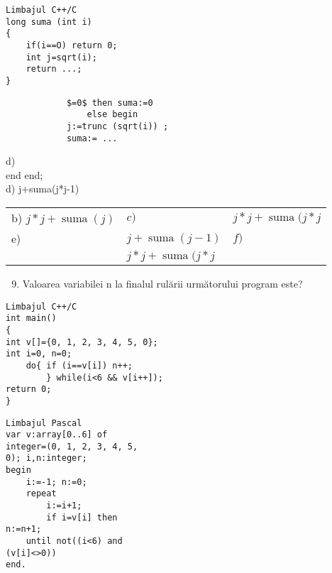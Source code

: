 \begin{verbatim}
Limbajul C++/C
long suma (int i)
{
    if(i==O) return 0;
    int j=sqrt(i);
    return ...;
}
\end{verbatim}

\begin{verbatim}
            $=0$ then suma:=0
                else begin
            j:=trunc (sqrt(i)) ;
            suma:= ...
\end{verbatim}

d)\\
end end;\\
d) j+suma(j*j-1)

\begin{center}
\begin{tabular}{lll}
b) $j * j+\operatorname{suma}(j)$ & $c)$ & $j * j+\operatorname{suma}(j * j$ \\
e) & $j+\operatorname{suma}(j-1)$ & $f)$ \\
 & $j * j+\operatorname{suma}(j * j$ &  \\
\end{tabular}
\end{center}

\begin{enumerate}
  \setcounter{enumi}{8}
  \item Valoarea variabilei n la finalul rulării următorului program este?
\end{enumerate}

\begin{verbatim}
Limbajul C++/C
int main()
{
int v[]={0, 1, 2, 3, 4, 5, 0};
int i=0, n=0;
    do{ if (i==v[i]) n++;
        } while(i<6 && v[i++]);
return 0;
}
\end{verbatim}

\begin{verbatim}
Limbajul Pascal
var v:array[0..6] of
integer=(0, 1, 2, 3, 4, 5,
0); i,n:integer;
begin
    i:=-1; n:=0;
    repeat
        i:=i+1;
        if i=v[i] then
n:=n+1;
    until not((i<6) and
(v[i]<>0))
end.
\end{verbatim}

